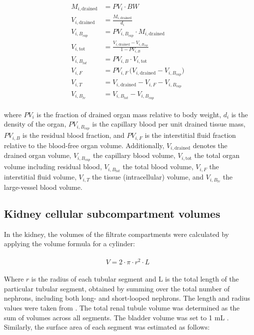 \documentclass[preprint,12pt,authoryear]{elsarticle}
\begin{document}
\begin{align}
\begin{aligned}
M_{i,\mathrm{drained}} &= PV_{i} \cdot BW  \\
V_{i,\mathrm{drained}} &= \frac{M_{i,\mathrm{drained}}}{d_{i}} \\
V_{i,B_{cap}} &= PV_{i,B_{cap}} \cdot M_{i,\mathrm{drained}} \\
V_{i,\mathrm{tot}} &= \frac{V_{i,\mathrm{drained}} - V_{i,B_{cap}}}{1 - PV_{i,B}} \\
V_{i,B_{tot}} &= PV_{i,B} \cdot V_{i,\mathrm{tot}} \\
V_{i,F} &= PV_{i,F}\, \big(V_{i,\mathrm{drained}} - V_{i,B_{cap}}\big) \\
V_{i,T} &= V_{i,\mathrm{drained}} - V_{i,F} - V_{i,B_{cap}} \\
V_{i,B_{lv}} &= V_{i,B_{tot}} - V_{i,B_{cap}}
\end{aligned}
\end{align}

\noindent where $PV_{i}$ is the fraction of drained organ mass relative to body weight, $d_{i}$ is the density of the organ, $PV_{i,B_{cap}}$ is the capillary blood per unit drained tissue mass, $PV_{i,B}$ is the residual blood fraction, and $PV_{i,F}$ is the interstitial fluid fraction relative to the blood-free organ volume. Additionally, $V_{i,\mathrm{drained}}$ denotes the drained organ volume, $V_{i,B_{cap}}$ the capillary blood volume, $V_{i,\mathrm{tot}}$ the total organ volume including residual blood, $V_{i,B_{tot}}$ the total blood volume, $V_{i,F}$ the interstitial fluid volume, $V_{i,T}$ the tissue (intracellular) volume, and $V_{i,B_{lv}}$ the large-vessel blood volume.

 \subsection{Kidney cellular subcompartment volumes}

In the kidney, the volumes of the filtrate compartments were calculated by applying the volume formula for a cylinder:

\begin{align}
\begin{aligned}
V=2\cdot \pi \cdot  r^2 \cdot L
\end{aligned} 
\end{align}

\noindent
Where $r$ is the radius of each tubular segment and $\text{L}$ is the total length of the particular tubular segment, obtained by summing over the total number of nephrons, including both long- and short-looped nephrons. The length and radius values were taken from \citet{gilmer_2018}. The total renal tubule volume was determined as the sum of volumes across all segments. The bladder volume was set to 1 mL \citep{andersson_2004}. Similarly, the surface area of each segment was estimated as follows:
\end{document}
